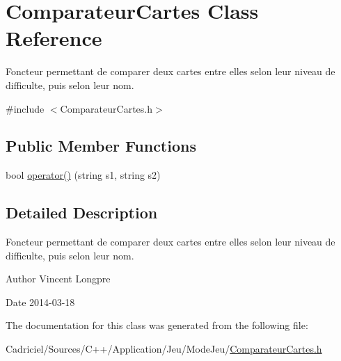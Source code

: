\hypertarget{class_comparateur_cartes}{\section{Comparateur\-Cartes Class Reference}
\label{class_comparateur_cartes}
}


Foncteur permettant de comparer deux cartes entre elles selon leur niveau de difficulte, puis selon leur nom.  




{\ttfamily \#include $<$Comparateur\-Cartes.\-h$>$}

\subsection*{Public Member Functions}
\begin{DoxyCompactItemize}
\item 
bool \hyperlink{group__inf2990_gac15d906e204ad5bb5942d3e21af77544}{operator()} (string s1, string s2)
\end{DoxyCompactItemize}


\subsection{Detailed Description}
Foncteur permettant de comparer deux cartes entre elles selon leur niveau de difficulte, puis selon leur nom. 

\begin{DoxyAuthor}{Author}
Vincent Longpre 
\end{DoxyAuthor}
\begin{DoxyDate}{Date}
2014-\/03-\/18 
\end{DoxyDate}


The documentation for this class was generated from the following file\-:\begin{DoxyCompactItemize}
\item 
Cadriciel/\-Sources/\-C++/\-Application/\-Jeu/\-Mode\-Jeu/\hyperlink{_comparateur_cartes_8h}{Comparateur\-Cartes.\-h}\end{DoxyCompactItemize}

